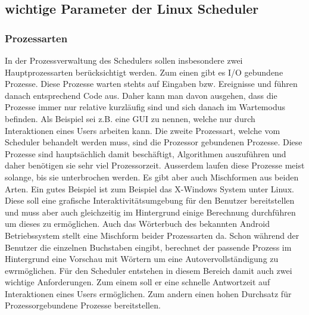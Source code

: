 \subsection{wichtige Parameter der Linux Scheduler}
\subsubsection{Prozessarten}
In der Prozessverwaltung des Schedulers sollen insbesondere zwei Hauptprozessarten berücksichtigt werden. Zum einen gibt es I/O gebundene Prozesse. Diese Prozesse warten stehts auf Eingaben bzw. Ereignisse und führen danach entsprechend Code aus. Daher kann man davon ausgehen, dass die Prozesse immer nur relative kurzläufig sind und sich danach im Wartemodus befinden. Als Beispiel sei z.B. eine GUI zu nennen, welche nur durch Interaktionen eines Users arbeiten kann.
Die zweite Prozessart, welche vom Scheduler behandelt werden muss, sind die Prozessor gebundenen Prozesse. Diese Prozesse sind hauptsächlich damit beschäftigt, Algorithmen auszuführen und daher be\-nötigen sie sehr viel Prozessorzeit. Ausserdem laufen diese Prozesse meist solange, bis sie unterbrochen werden.
Es gibt aber auch Mischformen aus beiden Arten. Ein gutes Beispiel ist zum Beispiel das X-Windows System unter Linux. Diese soll eine grafische Interaktivitätsumgebung für den Benutzer bereitstellen und muss aber auch gleichzeitig im Hintergrund einige Berechnung durchführen um dieses zu ermöglichen. 
Auch das Wörterbuch des bekannten Android Betriebssystem stellt eine Mischform beider Prozessarten da. Schon während der Benutzer die einzelnen Buchstaben eingibt, berechnet der passende Prozess im Hintergrund eine Vorschau mit Wörtern um eine Autovervollständigung zu ewrmöglichen.
Für den Scheduler entstehen in diesem Bereich damit auch zwei wichtige Anforderungen. Zum einem soll er eine schnelle Antwortzeit auf Interaktionen eines Users ermöglichen. Zum andern einen hohen Durchsatz für Prozessorgebundene Prozesse bereitstellen.

